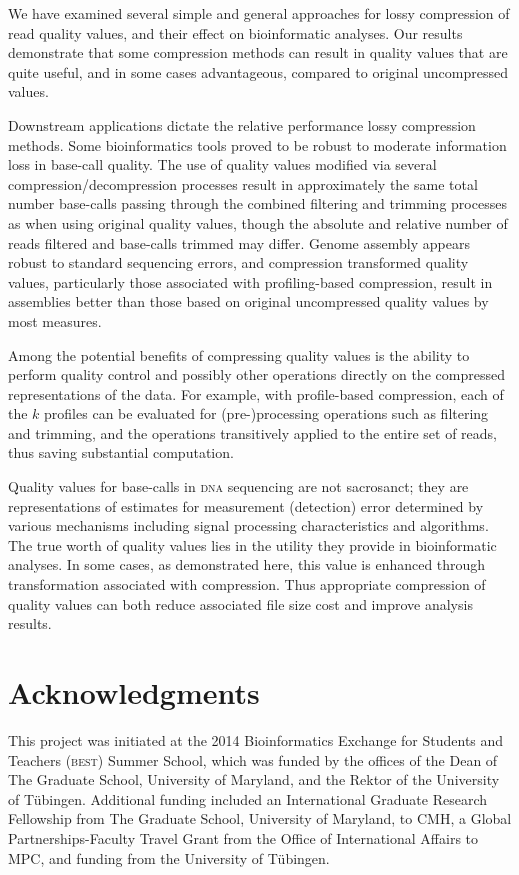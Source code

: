 \documentclass[fleqn,10pt,lineno]{wlpeerj} %
\begin{document}
We have examined several simple and general approaches for lossy
compression of read quality values, and their effect on bioinformatic
analyses. Our results demonstrate that some compression methods can
result in quality values that are quite useful, and in some cases
advantageous, compared to original uncompressed values.

Downstream applications dictate the relative performance lossy
compression methods.  Some bioinformatics tools proved to be robust to
moderate information loss in base-call quality. The use of quality
values modified via several compression/decompression processes result
in approximately the same total number base-calls passing through the
combined filtering and trimming processes as when using original
quality values, though the absolute and relative number of reads
filtered and base-calls trimmed may differ. Genome assembly appears
robust to standard sequencing errors, and compression transformed
quality values, particularly those associated with profiling-based
compression, result in assemblies better than those based on original
uncompressed quality values by most measures.

Among the potential benefits of compressing quality values is the
ability to perform quality control and possibly other operations
directly on the compressed representations of the data. For example,
with profile-based compression, each of the $k$ profiles can be
evaluated for (pre-)processing operations such as filtering and
trimming, and the operations transitively applied to the entire set of
reads, thus saving substantial computation.

Quality values for base-calls in \textsc{dna} sequencing are not
sacrosanct; they are representations of estimates for measurement
(detection) error determined by various mechanisms including signal
processing characteristics and algorithms. The true worth of quality
values lies in the utility they provide in bioinformatic analyses. In
some cases, as demonstrated here, this value is enhanced through
transformation associated with compression. Thus appropriate
compression of quality values can both reduce associated file size
cost and improve analysis results.

\section*{Acknowledgments}

This project was initiated at the 2014 Bioinformatics Exchange for
Students and Teachers (\textsc{best}) Summer School, which was funded
by the offices of the Dean of The Graduate School, University of
Maryland, and the Rektor of the University of T\"{u}bingen. Additional
funding included an International Graduate Research Fellowship from
The Graduate School, University of Maryland, to CMH, a Global
Partnerships-Faculty Travel Grant from the Office of International
Affairs to MPC, and funding from the University of T\"{u}bingen.
\end{document}

